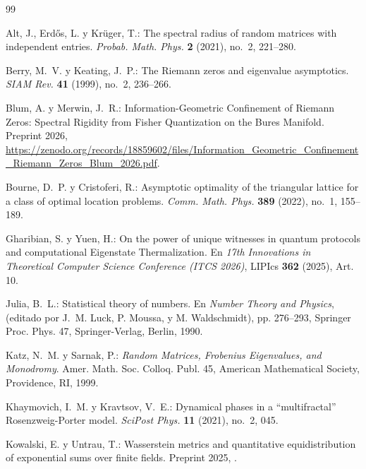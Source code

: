 \documentclass{article}
\numberwithin{equation}{section}
\theoremstyle{plain}
\theoremstyle{definition}
\begin{document}
\begin{thebibliography}{99}

Alt, J., Erdős, L. y Krüger, T.:
The spectral radius of random matrices with independent entries.
\emph{Probab. Math. Phys.} \textbf{2} (2021), no.~2, 221--280.

Berry, M.~V. y Keating, J.~P.: 
The Riemann zeros and eigenvalue asymptotics. 
\emph{SIAM Rev.} \textbf{41} (1999), no.~2, 236--266.

Blum, A. y Merwin, J.~R.:
Information-Geometric Confinement of Riemann Zeros: Spectral Rigidity from Fisher Quantization on the Bures Manifold.
Preprint 2026, \url{https://zenodo.org/records/18859602/files/Information_Geometric_Confinement_Riemann_Zeros_Blum_2026.pdf}.

Bourne, D.~P. y Cristoferi, R.: 
Asymptotic optimality of the triangular lattice for a class of optimal location problems. 
\emph{Comm. Math. Phys.} \textbf{389} (2022), no.~1, 155--189.

Gharibian, S. y Yuen, H.:
On the power of unique witnesses in quantum protocols and computational Eigenstate Thermalization.
En \emph{17th Innovations in Theoretical Computer Science Conference (ITCS 2026)}, LIPIcs \textbf{362} (2025), Art. 10.

Julia, B.~L.: 
Statistical theory of numbers.
En \emph{Number Theory and Physics}, (editado por J.~M. Luck, P. Moussa, y M. Waldschmidt), 
pp. 276--293, Springer Proc. Phys. 47, Springer-Verlag, Berlin, 1990.

Katz, N.~M. y Sarnak, P.: 
\emph{Random Matrices, Frobenius Eigenvalues, and Monodromy}. 
Amer. Math. Soc. Colloq. Publ. 45, American Mathematical Society, Providence, RI, 1999.

Khaymovich, I.~M. y Kravtsov, V.~E.: 
Dynamical phases in a ``multifractal'' Rosenzweig-Porter model.
\emph{SciPost Phys.} \textbf{11} (2021), no.~2, 045.

Kowalski, E. y Untrau, T.:
Wasserstein metrics and quantitative equidistribution of exponential sums over finite fields.
Preprint 2025, .


\end{thebibliography}
\end{document}
